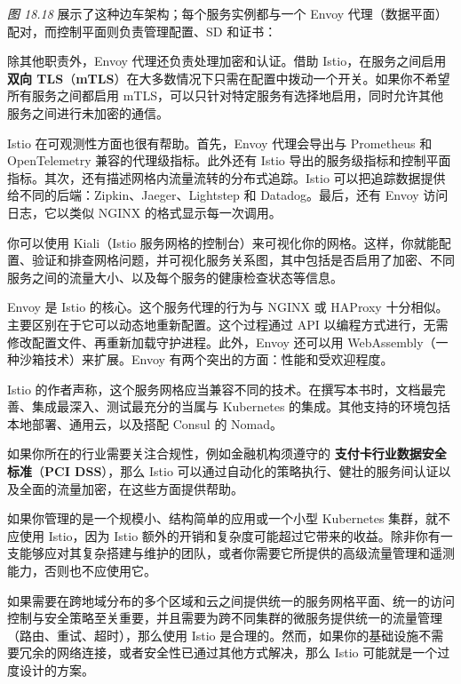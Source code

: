 \emph{图 18.18} 展示了这种边车架构；每个服务实例都与一个 Envoy 代理（数据平面）配对，而控制平面则负责管理配置、SD 和证书：


\label{idx:2047}
\label{idx:2048}
除其他职责外，Envoy 代理还负责处理加密和认证。借助 Istio，在服务之间启用 \textbf{双向 TLS}（\textbf{mTLS}）在大多数情况下只需在配置中拨动一个开关。如果你不希望所有服务之间都启用 mTLS，可以只针对特定服务有选择地启用，同时允许其他服务之间进行未加密的通信。

Istio 在可观测性方面也很有帮助。首先，Envoy 代理会导出与 Prometheus 和 OpenTelemetry 兼容的代理级指标。此外还有 Istio 导出的服务级指标和控制平面指标。其次，还有描述网格内流量流转的分布式追踪。Istio 可以把追踪数据提供给不同的后端：Zipkin、Jaeger、Lightstep 和 Datadog。最后，还有 Envoy 访问日志，它以类似 NGINX 的格式显示每一次调用。

你可以使用 Kiali（Istio 服务网格的控制台）来可视化你的网格。这样，你就能配置、验证和排查网格问题，并可视化服务关系图，其中包括是否启用了加密、不同服务之间的流量大小、以及每个服务的健康检查状态等信息。

\label{idx:2049}
Envoy 是 Istio 的核心。这个服务代理的行为与 NGINX 或 HAProxy 十分相似。主要区别在于它可以动态地重新配置。这个过程通过 API 以编程方式进行，无需修改配置文件、再重新加载守护进程。此外，Envoy 还可以用 WebAssembly（一种沙箱技术）来扩展。Envoy 有两个突出的方面：性能和受欢迎程度。

\label{idx:2050}
Istio 的作者声称，这个服务网格应当兼容不同的技术。在撰写本书时，文档最完善、集成最深入、测试最充分的当属与 Kubernetes 的集成。其他支持的环境包括本地部署、通用云，以及搭配 Consul 的 Nomad。

\label{idx:2051}
如果你所在的行业需要关注合规性，例如金融机构须遵守的 \textbf{支付卡行业数据安全标准}（\textbf{PCI DSS}），那么 Istio 可以通过自动化的策略执行、健壮的服务间认证以及全面的流量加密，在这些方面提供帮助。

如果你管理的是一个规模小、结构简单的应用或一个小型 Kubernetes 集群，就不应使用 Istio，因为 Istio 额外的开销和复杂度可能超过它带来的收益。除非你有一支能够应对其复杂搭建与维护的团队，或者你需要它所提供的高级流量管理和遥测能力，否则也不应使用它。

\label{idx:2052}
如果需要在跨地域分布的多个区域和云之间提供统一的服务网格平面、统一的访问控制与安全策略至关重要，并且需要为跨不同集群的微服务提供统一的流量管理（路由、重试、超时），那么使用 Istio 是合理的。然而，如果你的基础设施不需要冗余的网络连接，或者安全性已通过其他方式解决，那么 Istio 可能就是一个过度设计的方案。

